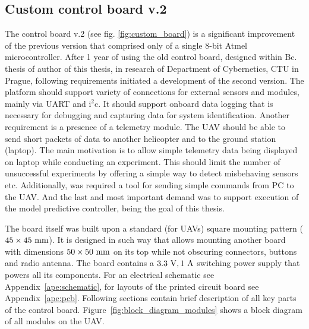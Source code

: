 \subsection{Custom control board v.2}

The control board v.2 (see fig. \ref{fig:custom_board}) is a significant improvement of the previous version \citep{baca2013} that comprised only of a single 8-bit Atmel microcontroller. After 1 year of using the old control board, designed within Bc. thesis of author of this thesis, in research of Department of Cybernetics, CTU in Prague, following requirements initiated a development of the second version. The platform should support variety of connections for external sensors and modules, mainly via UART and $\mathrm{i}^2\mathrm{c}$. It should support onboard data logging that is necessary for debugging and capturing data for system identification. Another requirement is a presence of a telemetry module. The UAV should be able to send short packets of data to another helicopter and to the ground station (laptop). The main motivation is to allow simple telemetry data being displayed on laptop while conducting an experiment. This should limit the number of unsuccessful experiments by offering a simple way to detect misbehaving sensors etc. Additionally, was required a tool for sending simple commands from PC to the UAV. And the last and most important demand was to support execution of the model predictive controller, being the goal of this thesis.

The board itself was built upon a standard (for UAVs) square mounting pattern ($45\times 45~\mathrm{mm}$). It is designed in such way that allows mounting another board with dimensions $50\times 50~\mathrm{mm}$ on its top while not obscuring connectors, buttons and radio antenna. The board contains a $3.3~\mathrm{V}, 1~\mathrm{A}$ switching power supply that powers all its components. For an electrical schematic see Appendix~\ref{ape:schematic}, for layouts of the printed circuit board see Appendix~\ref{ape:pcb}. Following sections contain brief description of all key parts of the control board. Figure~\ref{fig:block_diagram_modules} shows a block diagram of all modules on the UAV.

